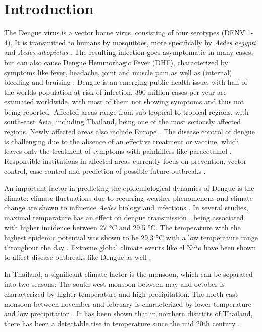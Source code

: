 \section{Introduction}\label{sec:introduction}

The Dengue virus is a vector borne virus, consisting of four serotypes (DENV 1-4).  It is transmitted to humans by mosquitoes, more specifically by \emph{Aedes aegypti} and \emph{Aedes albopictus} \citep{Phanitchat.2019}. The resulting infection goes asymptomatic in many cases, but can also cause Dengue Hemmorhagic Fever (DHF), characterized by symptoms like fever, headache, joint and muscle pain as well as (internal) bleeding and bruising \citep{Gubler.1998}.
Dengue is an emerging public health issue, with half of the worlds population at risk of infection. 390 million cases per year are estimated worldwide, with most of them not showing symptoms and thus not being reported. Affected areas range from sub-tropical to tropical regions, with south-east Asia, including Thailand, being one of the most seriously affected regions. Newly affected areas also include Europe \citep{WHO.2023}.
The disease control of dengue is challenging due to the absence of an effective treatment or vaccine, which leaves only the treatment of symptoms with painkillers like paracetamol \citep{WHO.2023}. Responsible institutions in affected areas currently focus on prevention, vector control, case control and prediction of possible future outbreaks \citep{Phanitchat.2019}. 

An important factor in predicting the epidemiological dynamics of Dengue is the climate: climate fluctuations due to recurring weather phenomenons and climate change are shown to influence \emph{Aedes} biology and infections \citep{Descloux2012, Phanitchat.2019}.
In several studies, maximal temperature has an effect on dengue transmission \citep{Descloux2012}, being associated with higher incidence \citep{Phanitchat.2019} between 27 °C and 29,5 °C. The temperature with the highest epidemic potential was shown to be 29,3 °C with a low temperature range throughout the day \citep{Liu2014}. Extreme global climate events like el Niño have been shown to affect disease outbreaks like Dengue as well \citep{Anyamba2019}.

In Thailand, a significant climate factor is the monsoon, which can be separated into two seasons: The south-west monsoon between may and october is characterized by higher temperature and high precipitation. The north-east monsoon between november and february is characterized by lower temperature and low precipitation \citep{Kripalani1995}. It has been shown that in northern districts of Thailand, there has been a detectable rise in temperature since the mid 20th century \citep{Masud2016}.

